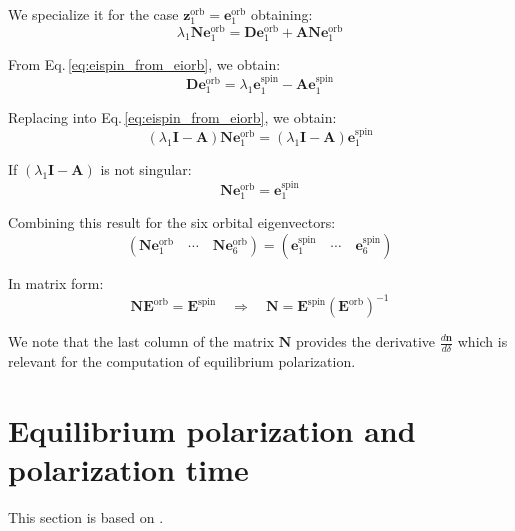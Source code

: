 We specialize it for the case $\bm{z}_1^{\text{orb}} = \bm{e}_1^{\text{orb}}$ obtaining:
\begin{equation}
\lambda_1 \mathbf{N} \bm{e}_1^{\text{orb}} = \mathbf{D} \bm{e}_1^{\text{orb}} + \mathbf{A} \mathbf{N} \bm{e}_1^{\text{orb}}
\label{eq:isf_e1}
\end{equation}

From Eq.\,\ref{eq:eispin_from_eiorb}, we obtain:
\begin{equation}
\mathbf{D} \bm{e}_1^{\text{orb}} = \lambda_1 \bm{e}_1^{\text{spin}} - \mathbf{A} \bm{e}_1^{\text{spin}}
\end{equation}

Replacing into Eq.\,\ref{eq:eispin_from_eiorb}, we obtain:
\begin{equation}
(\lambda_1 \mathbf{I} - \mathbf{A}) \mathbf{N} \bm{e}_1^{\text{orb}} = (\lambda_1 \mathbf{I} - \mathbf{A}) \bm{e}_1^{\text{spin}}
\end{equation}

If $(\lambda_1 \mathbf{I} - \mathbf{A})$ is not singular:
\begin{equation}
\mathbf{N} \bm{e}_1^{\text{orb}} = \bm{e}_1^{\text{spin}}
\end{equation}

Combining this result for the six orbital eigenvectors:
\begin{equation}
\left( \mathbf{N} \bm{e}_1^{\text{orb}} \quad \cdots \quad \mathbf{N} \bm{e}_6^{\text{orb}} \right)
=
\left( \bm{e}_1^{\text{spin}} \quad \cdots \quad \bm{e}_6^{\text{spin}} \right)
\end{equation}

In matrix form:
\begin{equation}
\mathbf{N} \mathbf{E}^{\text{orb}} = \mathbf{E}^{\text{spin}}
\quad \Rightarrow \quad
\mathbf{N} = \mathbf{E}^{\text{spin}} \left( \mathbf{E}^{\text{orb}} \right)^{-1}
\end{equation}

We note that the last column of the matrix $\bm{N}$ provides the derivative $\frac{d \bm{n}}{d \delta}$ which is relevant for the computation of equilibrium polarization.

\section{Equilibrium polarization and polarization time}

This section is based on \cite{Chao:1980fz, Derbenev:1973ia, Boge:1994we, Sagan:BmadManual, Mane:1986qy, Barber:1999xm}.

